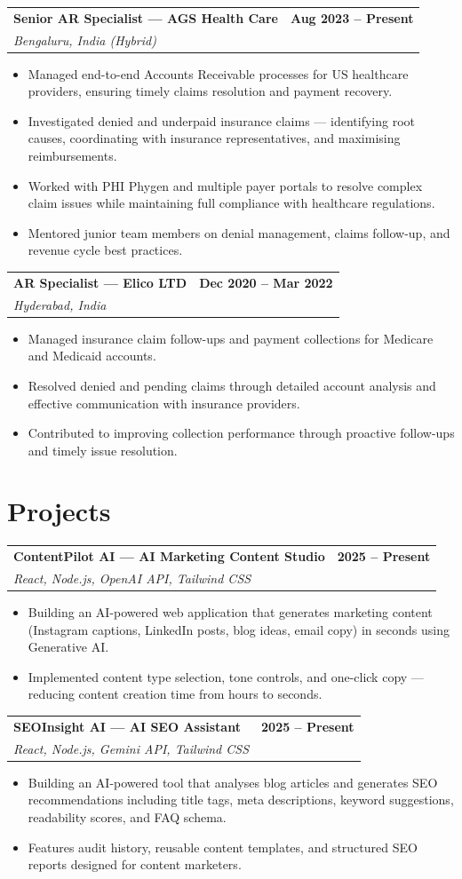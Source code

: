 \documentclass[10pt,a4paper]{article}
\newcommand{\resumeItem}[1]{\item #1}
\newcommand{\resumeSubheading}[4]{
  \begin{tabularx}{\textwidth}{X r}
    \textbf{#1} & \textbf{#2} \\
    \textit{#3} & \textit{#4} \\
  \end{tabularx}
}
\begin{document}
\resumeSubheading
{Senior AR Specialist --- AGS Health Care}{Aug 2023 -- Present}
{Bengaluru, India (Hybrid)}{}
\begin{itemize}
\resumeItem{Managed end-to-end Accounts Receivable processes for US healthcare providers, ensuring timely claims resolution and payment recovery.}
\resumeItem{Investigated denied and underpaid insurance claims --- identifying root causes, coordinating with insurance representatives, and maximising reimbursements.}
\resumeItem{Worked with PHI Phygen and multiple payer portals to resolve complex claim issues while maintaining full compliance with healthcare regulations.}
\resumeItem{Mentored junior team members on denial management, claims follow-up, and revenue cycle best practices.}
\end{itemize}

\resumeSubheading
{AR Specialist --- Elico LTD}{Dec 2020 -- Mar 2022}
{Hyderabad, India}{}
\begin{itemize}
\resumeItem{Managed insurance claim follow-ups and payment collections for Medicare and Medicaid accounts.}
\resumeItem{Resolved denied and pending claims through detailed account analysis and effective communication with insurance providers.}
\resumeItem{Contributed to improving collection performance through proactive follow-ups and timely issue resolution.}
\end{itemize}

\section*{Projects}

\resumeSubheading
{ContentPilot AI --- AI Marketing Content Studio}{2025 -- Present}
{React, Node.js, OpenAI API, Tailwind CSS}{}
\begin{itemize}
\resumeItem{Building an AI-powered web application that generates marketing content (Instagram captions, LinkedIn posts, blog ideas, email copy) in seconds using Generative AI.}
\resumeItem{Implemented content type selection, tone controls, and one-click copy --- reducing content creation time from hours to seconds.}
\end{itemize}

\resumeSubheading
{SEOInsight AI --- AI SEO Assistant}{2025 -- Present}
{React, Node.js, Gemini API, Tailwind CSS}{}
\begin{itemize}
\resumeItem{Building an AI-powered tool that analyses blog articles and generates SEO recommendations including title tags, meta descriptions, keyword suggestions, readability scores, and FAQ schema.}
\resumeItem{Features audit history, reusable content templates, and structured SEO reports designed for content marketers.}
\end{itemize}
\end{document}
